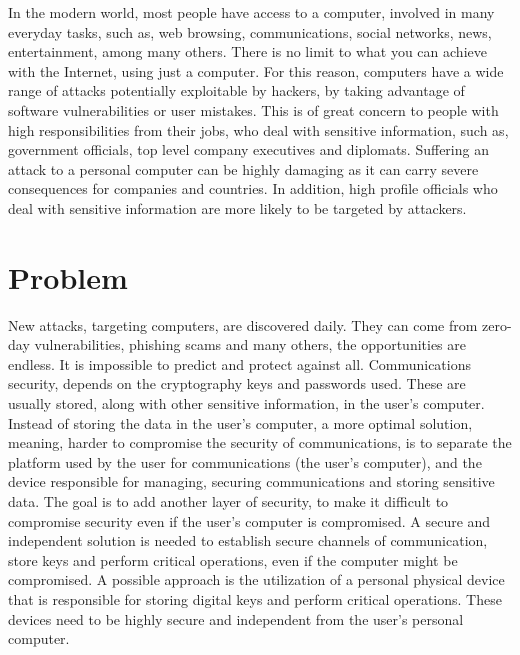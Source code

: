 \cleardoublepage
\label{chap:intro}

In the modern world, most people have access to a computer, involved in many everyday tasks, such as, web browsing, communications, social networks, news, entertainment, among many others.
There is no limit to what you can achieve with the Internet, using just a computer.
For this reason, computers have a wide range of attacks potentially exploitable by hackers, by taking advantage of software vulnerabilities or user mistakes.
This is of great concern to people with high responsibilities from their jobs, who deal with sensitive information, such as, government officials, top level company executives and diplomats.
Suffering an attack to a personal computer can be highly damaging as it can carry severe consequences for companies and countries.
In addition, high profile officials who deal with sensitive information are more likely to be targeted by attackers.

\section{Problem} \label{chap:intro:problem}

New attacks, targeting computers, are discovered daily.
They can come from zero-day vulnerabilities, phishing scams and many others, the opportunities are endless. It is impossible to predict and protect against all.
Communications security, depends on the cryptography keys and passwords used. These are usually stored, along with other sensitive information, in the user's computer.
Instead of storing the data in the user's computer, a more optimal solution, meaning, harder to compromise the security of communications, is to separate the platform used by the user for communications (the user's computer), and the device responsible for managing, securing communications and storing sensitive data.
The goal is to add another layer of security, to make it difficult to compromise security even if the user's computer is compromised.
A secure and independent solution is needed to establish secure channels of communication, store keys and perform critical operations, even if the computer might be compromised.
A possible approach is the utilization of a personal physical device that is responsible for storing digital keys and perform critical operations.
These devices need to be highly secure and independent from the user's personal computer.


